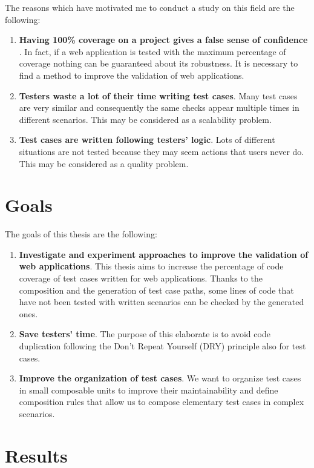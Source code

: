 The reasons which have motivated me to conduct a study on this field are the following:

\begin{enumerate}
\item \textbf{Having 100\% coverage on a project gives a false sense of confidence} \cite{article:coverage}. In fact, if a web application is tested with the maximum percentage of coverage nothing can be guaranteed about its robustness. It is necessary to find a method to improve the validation of web applications.
\item \textbf{Testers waste a lot of their time writing test cases}. Many test cases are very similar and consequently the same checks appear multiple times in different scenarios. This may be considered as a scalability problem.
\item \textbf{Test cases are written following testers' logic}. Lots of different situations are not tested because they may seem actions that users never do. This may be considered as a quality problem.
\end{enumerate}

\section{Goals}

The goals of this thesis are the following:

\begin{enumerate}
\item \textbf{Investigate and experiment approaches to improve the validation of web applications}. This thesis aims to increase the percentage of code coverage of test cases written for web applications. Thanks to the composition and the generation of test case paths, some lines of code that have not been tested with written scenarios can be checked by the generated ones.
\item \textbf{Save testers' time}. The purpose of this elaborate is to avoid code duplication following the Don't Repeat Yourself (DRY) principle also for test cases.
\item \textbf{Improve the organization of test cases}. We want to organize test cases in small composable units to improve their maintainability and define composition rules that allow us to compose elementary test cases in complex scenarios.
\end{enumerate}

\section{Results}

